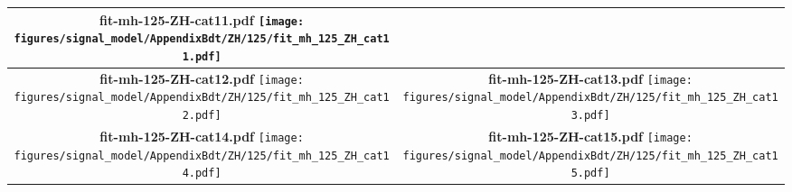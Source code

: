 \begin{longtable}{|c|c|}
{\centering
{\bfseries fit-mh-125-ZH-cat11.pdf}
\texttt{[image: figures/signal\_model/AppendixBdt/ZH/125/fit\_mh\_125\_ZH\_cat11.pdf]}
}
 \\
\hline
\parbox{0.47\textwidth}{
\centering
{\bfseries fit-mh-125-ZH-cat12.pdf}
\texttt{[image: figures/signal\_model/AppendixBdt/ZH/125/fit\_mh\_125\_ZH\_cat12.pdf]}
}
 & \parbox{0.47\textwidth}{
\centering
{\bfseries fit-mh-125-ZH-cat13.pdf}
\texttt{[image: figures/signal\_model/AppendixBdt/ZH/125/fit\_mh\_125\_ZH\_cat13.pdf]}
}
 \\
\hline
\parbox{0.47\textwidth}{
\centering
{\bfseries fit-mh-125-ZH-cat14.pdf}
\texttt{[image: figures/signal\_model/AppendixBdt/ZH/125/fit\_mh\_125\_ZH\_cat14.pdf]}
}
 & \parbox{0.47\textwidth}{
\centering
{\bfseries fit-mh-125-ZH-cat15.pdf}
\texttt{[image: figures/signal\_model/AppendixBdt/ZH/125/fit\_mh\_125\_ZH\_cat15.pdf]}
}
 \\
\hline
\end{longtable}

